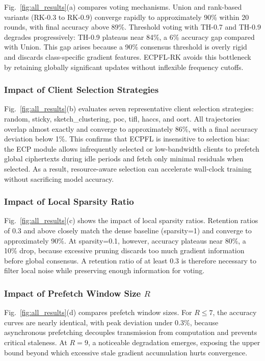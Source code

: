 Fig.~\ref{fig:all_results}(a) compares voting mechanisms.
Union and rank-based variants (RK-0.3 to RK-0.9) converge rapidly to approximately 90\% within 20 rounds, with final accuracy above 89\%.
Threshold voting with \textsc{TH-0.7} and \textsc{TH-0.9} degrades progressively: \textsc{TH-0.9} plateaus near 84\%, a 6\% accuracy gap compared with Union.
This gap arises because a 90\% consensus threshold is overly rigid and discards class-specific gradient features.
\textsc{ECPFL-RK} avoids this bottleneck by retaining globally significant updates without inflexible frequency cutoffs.

\subsubsection{Impact of Client Selection Strategies}

Fig.~\ref{fig:all_results}(b) evaluates seven representative client selection strategies: random, sticky, sketch\_clustering, poc, tifl, haccs, and oort.
All trajectories overlap almost exactly and converge to approximately 86\%, with a final accuracy deviation below 1\%.
This confirms that \textsc{ECPFL} is insensitive to selection bias: the ECP module allows infrequently selected or low-bandwidth clients to prefetch global ciphertexts during idle periods and fetch only minimal residuals when selected.
As a result, resource-aware selection can accelerate wall-clock training without sacrificing model accuracy.

\subsubsection{Impact of Local Sparsity Ratio}

Fig.~\ref{fig:all_results}(c) shows the impact of local sparsity ratios.
Retention ratios of 0.3 and above closely match the dense baseline (sparsity=1) and converge to approximately 90\%.
At sparsity=0.1, however, accuracy plateaus near 80\%, a 10\% drop, because excessive pruning discards too much gradient information before global consensus.
A retention ratio of at least 0.3 is therefore necessary to filter local noise while preserving enough information for voting.

\subsubsection{Impact of Prefetch Window Size $R$}

Fig.~\ref{fig:all_results}(d) compares prefetch window sizes.
For $R \leq 7$, the accuracy curves are nearly identical, with peak deviation under 0.3\%, because asynchronous prefetching decouples transmission from computation and prevents critical staleness.
At $R=9$, a noticeable degradation emerges, exposing the upper bound beyond which excessive stale gradient accumulation hurts convergence.
